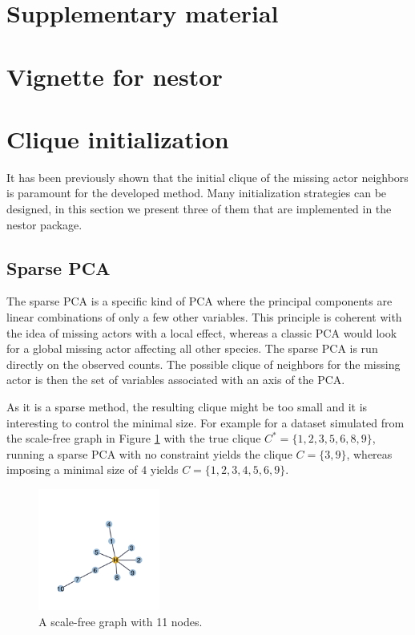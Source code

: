 \begin{subappendices}
\section{Supplementary material}
 


\section{Vignette for nestor}
\section{Clique initialization}
It has been previously shown that the initial clique of the missing actor neighbors is paramount for the developed method. Many initialization strategies can be designed, in this section we present three of them that are implemented in the nestor package.

\tocless\subsection{Sparse PCA}
The sparse PCA is a specific kind of  PCA where the principal components are linear combinations of only a few other variables. This principle is coherent with the idea of missing actors with a local effect, whereas a classic PCA would look for a global missing actor affecting all other species. The sparse PCA is run directly on the observed counts. The possible clique of neighbors for the missing actor is then the set of variables associated with an axis of the PCA.

As it is a sparse method, the resulting clique might be too small and it is interesting to control the minimal size. For example
for a dataset simulated from the scale-free graph in Figure \ref{Sfspca} with the true clique $C^*=\{1,2,3,5,6,8,9\}$, running a sparse PCA with no constraint yields the clique $C=\{3,9\}$, whereas imposing a minimal size of $4$ yields $C=\{1,2,3,4,5,6,9\}$.
\begin{figure}
\centering
\includegraphics[width=4cm]{figs/SF_spca.png}
\caption{A scale-free graph with 11 nodes.}
\label{Sfspca}
\end{figure}



\end{subappendices}
